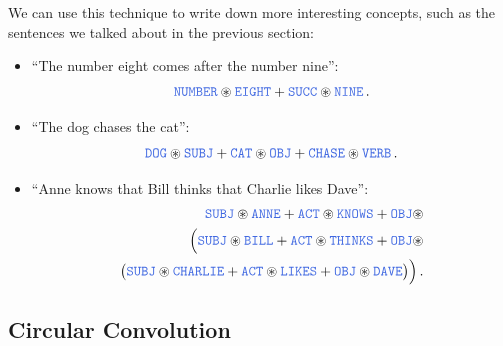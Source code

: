 \documentclass[10pt,letterpaper,oneside]{article}
\begin{document}
We can use this technique to write down more interesting concepts, such as the sentences we talked about in the previous section:
\begin{itemize}
	\item \enquote{The number eight comes after the number nine}:
	\begin{align*}
		\Obj{NUMBER} \CC \Obj{EIGHT} + \Obj{SUCC} \CC \Obj{NINE} \,.
	\end{align*}
	\item \enquote{The dog chases the cat}:
	\begin{align*}
		\Obj{DOG} \CC \Obj{SUBJ} + \Obj{CAT} \CC \Obj{OBJ} + \Obj{CHASE} \CC \Obj{VERB} \,.
	\end{align*}
	\item \enquote{Anne knows that Bill thinks that Charlie likes Dave}:
	\begin{align*}
	 	\Obj{SUBJ} \CC \Obj{ANNE} + \Obj{ACT} \CC \Obj{KNOWS} + \Obj{OBJ} \CC \\\Big(\Obj{SUBJ} \CC \Obj{BILL} + \Obj{ACT} \CC \Obj{THINKS} + \Obj{OBJ} \CC \\ \big(\Obj{SUBJ} \CC \Obj{CHARLIE} + \Obj{ACT} \CC \Obj{LIKES} + \Obj{OBJ} \CC \Obj{DAVE}\big)\Big) \,.
	\end{align*}
\end{itemize}

\subsection{Circular Convolution}
\end{document}
